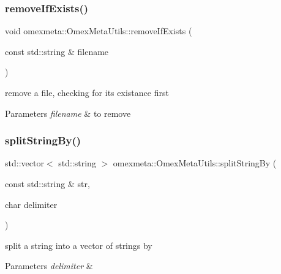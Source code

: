 \subsubsection{\texorpdfstring{remove\+If\+Exists()}{removeIfExists()}}
{\footnotesize\ttfamily void omexmeta\+::\+Omex\+Meta\+Utils\+::remove\+If\+Exists (\begin{DoxyParamCaption}\item[{const std\+::string \&}]{filename }\end{DoxyParamCaption})\hspace{0.3cm}{\ttfamily [static]}}



remove a file, checking for its existance first 


\begin{DoxyParams}{Parameters}
{\em filename} & to remove \\
\hline
\end{DoxyParams}
\mbox{\label{classomexmeta_1_1OmexMetaUtils_aac769ce6e901f32820cd7dc3fef989fa}} 
\subsubsection{\texorpdfstring{split\+String\+By()}{splitStringBy()}}
{\footnotesize\ttfamily std\+::vector$<$ std\+::string $>$ omexmeta\+::\+Omex\+Meta\+Utils\+::split\+String\+By (\begin{DoxyParamCaption}\item[{const std\+::string \&}]{str,  }\item[{char}]{delimiter }\end{DoxyParamCaption})\hspace{0.3cm}{\ttfamily [static]}}



split a string into a vector of strings by 


\begin{DoxyParams}{Parameters}
{\em delimiter} & \\
\hline
\end{DoxyParams}
\mbox{\label{classomexmeta_1_1OmexMetaUtils_a66d58e0ebcbee1857b23ead70c87de7f}} 
